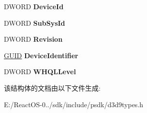 \begin{DoxyCompactItemize}
D\+W\+O\+RD {\bfseries Device\+Id}
\item 
\mbox{\label{struct___d3_d_a_d_a_p_t_e_r___i_d_e_n_t_i_f_i_e_r9_a1dfc0c2988bc1e8230454fd5ea02d3cf}} 
D\+W\+O\+RD {\bfseries Sub\+Sys\+Id}
\item 
\mbox{\label{struct___d3_d_a_d_a_p_t_e_r___i_d_e_n_t_i_f_i_e_r9_a4d14f1f1a7c95d775f3d28e58f6c4aaa}} 
D\+W\+O\+RD {\bfseries Revision}
\item 
\mbox{\label{struct___d3_d_a_d_a_p_t_e_r___i_d_e_n_t_i_f_i_e_r9_af093efde6d52bff321f5088f68a42b92}} 
\hyperlink{interface_g_u_i_d}{G\+U\+ID} {\bfseries Device\+Identifier}
\item 
\mbox{\label{struct___d3_d_a_d_a_p_t_e_r___i_d_e_n_t_i_f_i_e_r9_ad81ffbfadb968ac2be4c1053d75b2283}} 
D\+W\+O\+RD {\bfseries W\+H\+Q\+L\+Level}
\end{DoxyCompactItemize}


该结构体的文档由以下文件生成\+:\begin{DoxyCompactItemize}
\item 
E\+:/\+React\+O\+S-\/0../sdk/include/psdk/d3d9types.\+h\end{DoxyCompactItemize}
